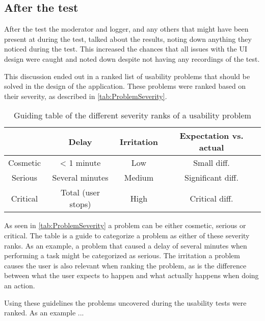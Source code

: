 \subsection{After the test}
After the test the moderator and logger, and any others that might have been present at during the test, talked about the results, noting down anything they noticed during the test. This increased the chances that all issues with the UI design were caught and noted down despite not having any recordings of the test. 
\par
This discussion ended out in a ranked list of usability problems that should be solved in the design of the application. These problems were ranked based on their severity, as described in \autoref{tab:ProblemSeverity}.

\begin{table}[H]
    \centering
    \begin{tabular}{|c||c|c|c|}
        \hline
        & Delay & Irritation & Expectation vs. actual
        \\
        \hline
        \hline
        Cosmetic & < 1 minute & Low & Small diff.
        \\
        \hline
        Serious & Several minutes & Medium & Significant diff.
        \\
        \hline
        Critical & Total (user stops) & High & Critical diff.
        \\
        \hline
    \end{tabular}
    \caption{Guiding table of the different severity ranks of a usability problem}
    \label{tab:ProblemSeverity}
\end{table}

As seen in \autoref{tab:ProblemSeverity} a problem can be either cosmetic, serious or critical. The table is a guide to categorize a problem as either of these severity ranks. As an example, a problem that caused a delay of several minutes when performing a task might be categorized as serious. The irritation a problem causes the user is also relevant when ranking the problem, as is the difference between what the user expects to happen and what actually happens when doing an action. 
\par
Using these guidelines the problems uncovered during the usability tests were ranked. As an example ...
